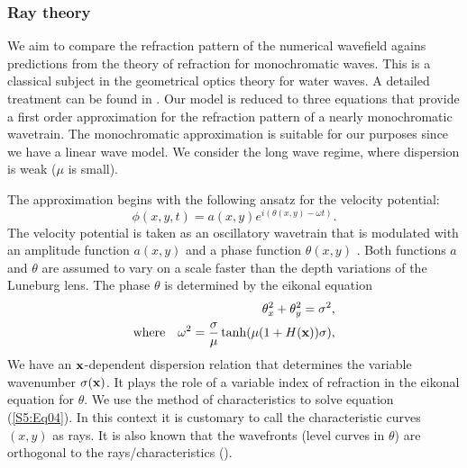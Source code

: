 \subsubsection{Ray theory}

We aim to compare the refraction pattern of the numerical wavefield agains  predictions from the 
theory of refraction for monochromatic waves. 
This is a classical subject in the geometrical optics theory for water waves.  A detailed treatment can be found in \citet{Whitham,Dingemans,Johnson}. Our model is reduced to three equations 
that provide a first order approximation for the refraction pattern of a nearly monochromatic wavetrain.
The monochromatic approximation is suitable for our purposes since we have a linear wave model. 
We consider the long wave regime, where dispersion is weak ($\mu$ is small).


The approximation begins with the following ansatz for the velocity potential: 
\begin{equation}\label{S5:Eq02}
\phi(x,y,t) = a(x,y)e^{i\left(\theta(x,y)-\omega t\right)}.
\end{equation}
The velocity potential is taken as an oscillatory wavetrain that is modulated with an amplitude function $a(x,y)$ and 
a phase function $\theta(x,y)$ .
Both functions $a$ and $\theta$ are assumed to vary on a scale faster than the depth  variations 
of the Luneburg lens.
The phase $\theta$  is determined  by the eikonal equation
\begin{eqnarray}
&&\theta_x^2 + \theta_y^2 = \sigma^2,\label{S5:Eq04}\\
&\mbox{where}&\omega^2 = \frac{\sigma}{\mu}\tanh(\mu(1+H(\bold{x}))\sigma),\label{S5:Eq03}
\end{eqnarray}
We have an $\bold{x}$-dependent dispersion relation that determines the variable wavenumber $\sigma(\bold{x})$. 
It plays the role of a variable index of refraction in the eikonal equation for $\theta$. 
We use the method of characteristics to solve equation (\ref{S5:Eq04}). In this context it is customary to call the 
characteristic curves $(x,y)$ as rays. It is also known that the wavefronts (level curves in $\theta$) are orthogonal 
to the rays/characteristics (\cite{Zauderer}).

